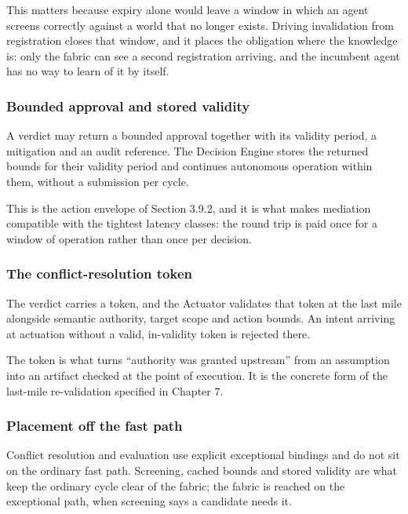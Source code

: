 This matters because expiry alone would leave a window in which an agent
screens correctly against a world that no longer exists. Driving
invalidation from registration closes that window, and it places the
obligation where the knowledge is: only the fabric can see a second
registration arriving, and the incumbent agent has no way to learn of it
by itself.

\hypertarget{bounded-approval-and-stored-validity}{%
\subsubsection{Bounded approval and stored validity}\label{bounded-approval-and-stored-validity}}

A verdict may return a bounded approval together with its validity
period, a mitigation and an audit reference. The Decision Engine stores
the returned bounds for their validity period and continues autonomous
operation within them, without a submission per cycle.

This is the action envelope of Section 3.9.2, and it is what makes
mediation compatible with the tightest latency classes: the round trip
is paid once for a window of operation rather than once per decision.

\hypertarget{the-conflict-resolution-token}{%
\subsubsection{The conflict-resolution token}\label{the-conflict-resolution-token}}

The verdict carries a token, and the Actuator validates that token at
the last mile alongside semantic authority, target scope and action
bounds. An intent arriving at actuation without a valid, in-validity
token is rejected there.

The token is what turns ``authority was granted upstream'' from an
assumption into an artifact checked at the point of execution. It is the
concrete form of the last-mile re-validation specified in Chapter 7.

\hypertarget{placement-off-the-fast-path}{%
\subsubsection{Placement off the fast path}\label{placement-off-the-fast-path}}

Conflict resolution and evaluation use explicit exceptional bindings and
do not sit on the ordinary fast path. Screening, cached bounds and
stored validity are what keep the ordinary cycle clear of the fabric;
the fabric is reached on the exceptional path, when screening says a
candidate needs it.

